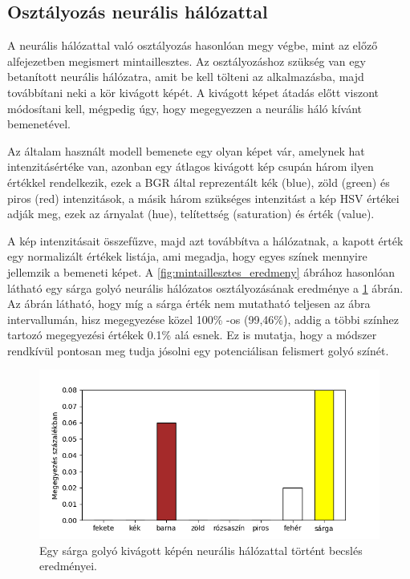 \subsection{Osztályozás neurális hálózattal}
A neurális hálózattal való osztályozás hasonlóan megy végbe, mint az előző alfejezetben megismert mintaillesztes. Az osztályozáshoz szükség van egy betanított neurális hálózatra, amit be kell tölteni az alkalmazásba, majd továbbítani neki a kör kivágott képét. A kivágott képet átadás előtt viszont módosítani kell, mégpedig úgy, hogy megegyezzen a neurális háló kívánt bemenetével.
\par Az általam használt modell bemenete egy olyan képet vár, amelynek hat intenzitásértéke van, azonban egy átlagos kivágott kép csupán három ilyen értékkel rendelkezik, ezek a BGR által reprezentált kék (blue), zöld (green) és piros (red) intenzitások, a másik három szükséges intenzitást a kép HSV értékei adják meg, ezek az árnyalat (hue), telítettség (saturation) és érték (value).
\par A kép intenzitásait összefűzve, majd azt továbbítva a hálózatnak, a kapott érték egy normalizált értékek listája, ami megadja, hogy egyes színek mennyire jellemzik a bemeneti képet. A \ref{fig:mintaillesztes_eredmeny} ábrához hasonlóan látható egy sárga golyó neurális hálózatos osztályozásának eredménye a \ref{fig:neuralis_osztalyozas_eredmeny} ábrán. Az ábrán látható, hogy míg a sárga érték nem mutatható teljesen az ábra intervallumán, hisz megegyezése közel 100\% -os (99,46\%), addig a többi színhez tartozó megegyezési értékek 0.1\% alá esnek. Ez is mutatja, hogy a módszer rendkívül pontosan meg tudja jósolni egy potenciálisan felismert golyó színét.

\begin{figure}[!ht]
    \centering
    \includegraphics[width=140mm, keepaspectratio]{figures/neural_values.png}
    \caption{Egy sárga golyó kivágott képén neurális hálózattal történt becslés eredményei.}
    \label{fig:neuralis_osztalyozas_eredmeny}
\end{figure}

